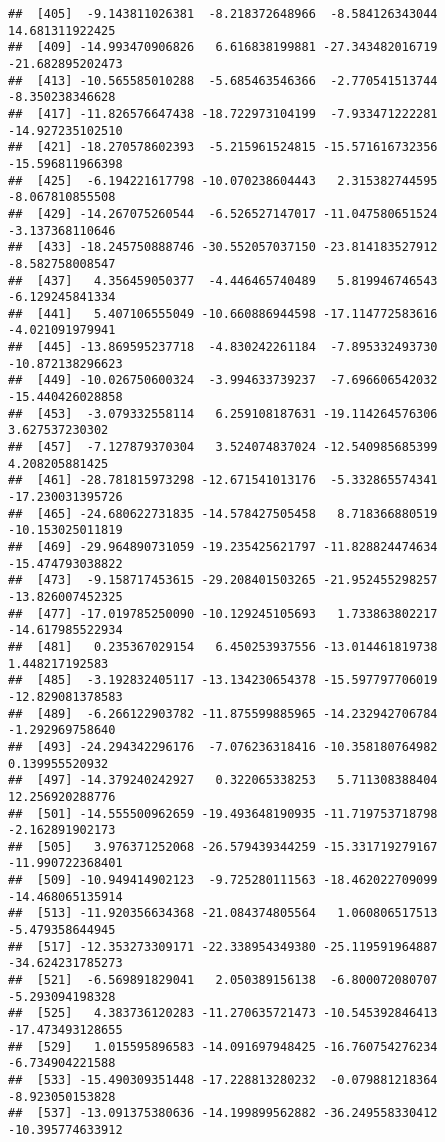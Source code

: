 \documentclass[
]{article}
\begin{document}
\begin{verbatim}
##  [405]  -9.143811026381  -8.218372648966  -8.584126343044  14.681311922425
##  [409] -14.993470906826   6.616838199881 -27.343482016719 -21.682895202473
##  [413] -10.565585010288  -5.685463546366  -2.770541513744  -8.350238346628
##  [417] -11.826576647438 -18.722973104199  -7.933471222281 -14.927235102510
##  [421] -18.270578602393  -5.215961524815 -15.571616732356 -15.596811966398
##  [425]  -6.194221617798 -10.070238604443   2.315382744595  -8.067810855508
##  [429] -14.267075260544  -6.526527147017 -11.047580651524  -3.137368110646
##  [433] -18.245750888746 -30.552057037150 -23.814183527912  -8.582758008547
##  [437]   4.356459050377  -4.446465740489   5.819946746543  -6.129245841334
##  [441]   5.407106555049 -10.660886944598 -17.114772583616  -4.021091979941
##  [445] -13.869595237718  -4.830242261184  -7.895332493730 -10.872138296623
##  [449] -10.026750600324  -3.994633739237  -7.696606542032 -15.440426028858
##  [453]  -3.079332558114   6.259108187631 -19.114264576306   3.627537230302
##  [457]  -7.127879370304   3.524074837024 -12.540985685399   4.208205881425
##  [461] -28.781815973298 -12.671541013176  -5.332865574341 -17.230031395726
##  [465] -24.680622731835 -14.578427505458   8.718366880519 -10.153025011819
##  [469] -29.964890731059 -19.235425621797 -11.828824474634 -15.474793038822
##  [473]  -9.158717453615 -29.208401503265 -21.952455298257 -13.826007452325
##  [477] -17.019785250090 -10.129245105693   1.733863802217 -14.617985522934
##  [481]   0.235367029154   6.450253937556 -13.014461819738   1.448217192583
##  [485]  -3.192832405117 -13.134230654378 -15.597797706019 -12.829081378583
##  [489]  -6.266122903782 -11.875599885965 -14.232942706784  -1.292969758640
##  [493] -24.294342296176  -7.076236318416 -10.358180764982   0.139955520932
##  [497] -14.379240242927   0.322065338253   5.711308388404  12.256920288776
##  [501] -14.555500962659 -19.493648190935 -11.719753718798  -2.162891902173
##  [505]   3.976371252068 -26.579439344259 -15.331719279167 -11.990722368401
##  [509] -10.949414902123  -9.725280111563 -18.462022709099 -14.468065135914
##  [513] -11.920356634368 -21.084374805564   1.060806517513  -5.479358644945
##  [517] -12.353273309171 -22.338954349380 -25.119591964887 -34.624231785273
##  [521]  -6.569891829041   2.050389156138  -6.800072080707  -5.293094198328
##  [525]   4.383736120283 -11.270635721473 -10.545392846413 -17.473493128655
##  [529]   1.015595896583 -14.091697948425 -16.760754276234  -6.734904221588
##  [533] -15.490309351448 -17.228813280232  -0.079881218364  -8.923050153828
##  [537] -13.091375380636 -14.199899562882 -36.249558330412 -10.395774633912

\end{verbatim}
\end{document}
